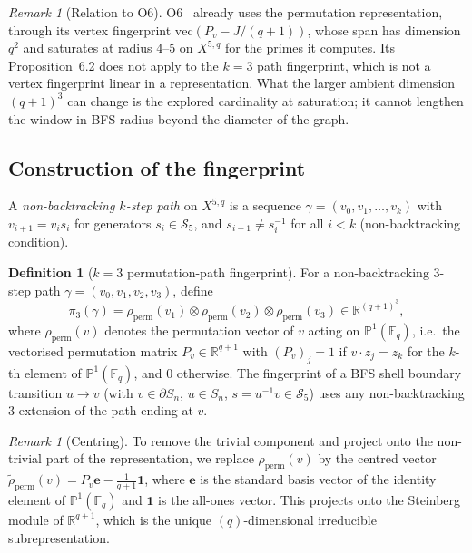 \documentclass[11pt,a4paper]{article}
\theoremstyle{definition}
\newtheorem{definition}[theorem]{Definition}
\theoremstyle{remark}
\newtheorem{remark}[theorem]{Remark}
\newcommand{\R}{\mathbb{R}}
\newcommand{\F}{\mathbb{F}}
\newcommand{\Proj}{\mathbb{P}}
\newcommand{\perm}{\mathrm{perm}}
\begin{document}
    \begin{remark}[Relation to O6]
      \label{rem:perm-escape}
      O6~\cite{Beau2026a10} already uses the permutation representation, through its vertex
      fingerprint $\mathrm{vec}(P_v - J/(q+1))$, whose span has dimension $q^2$ and saturates at
      radius $4$--$5$ on $X^{5,q}$ for the primes it computes.
      Its Proposition~6.2 does not apply to the $k=3$ path fingerprint, which is not a vertex
      fingerprint linear in a representation.
      What the larger ambient dimension $(q+1)^3$ can change is the explored cardinality at
      saturation; it cannot lengthen the window in BFS radius beyond the diameter of the graph.
    \end{remark}

  \subsection{Construction of the fingerprint}
    \label{sec:fingerprint-def}

    A \emph{non-backtracking $k$-step path} on $X^{5,q}$ is a sequence
    $\gamma = (v_0, v_1, \ldots, v_k)$ with $v_{i+1} = v_i s_i$ for generators
    $s_i \in \mathcal{S}_5$, and $s_{i+1} \neq s_i^{-1}$ for all $i < k$ (non-backtracking
    condition).

    \begin{definition}[$k = 3$ permutation-path fingerprint]
      \label{def:fingerprint3}
      For a non-backtracking 3-step path $\gamma = (v_0, v_1, v_2, v_3)$, define
      \[
        \pi_3(\gamma)
        = \rho_\perm(v_1) \otimes \rho_\perm(v_2) \otimes \rho_\perm(v_3)
        \in \R^{(q+1)^3},
      \]
      where $\rho_\perm(v)$ denotes the permutation vector of $v$ acting on
      $\Proj^1(\F_q)$, i.e.\ the vectorised permutation matrix $P_v \in \R^{q+1}$
      with $(P_v)_j = 1$ if $v \cdot z_j = z_k$ for the $k$-th element of
      $\Proj^1(\F_q)$, and 0 otherwise.
      The fingerprint of a BFS shell boundary transition $u \to v$ (with
      $v \in \partial S_n$, $u \in S_n$, $s = u^{-1}v \in \mathcal{S}_5$)
      uses any non-backtracking 3-extension of the path ending at $v$.
    \end{definition}

    \begin{remark}[Centring]
      \label{rem:centring}
      To remove the trivial component and project onto the non-trivial part of the
      representation, we replace $\rho_\perm(v)$ by the centred vector
      $\tilde{\rho}_\perm(v) = P_v \mathbf{e} - \frac{1}{q+1}\mathbf{1}$,
      where $\mathbf{e}$ is the standard basis vector of the identity element of
      $\Proj^1(\F_q)$ and $\mathbf{1}$ is the all-ones vector.
      This projects onto the Steinberg module of $\R^{q+1}$, which is the unique
      $(q)$-dimensional irreducible subrepresentation.
    \end{remark}
\end{document}
